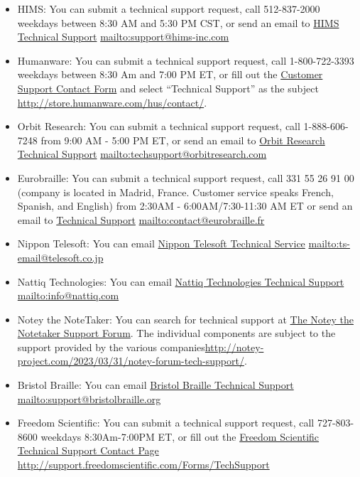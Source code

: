 \begin{itemize}[leftmargin=*]
\item HIMS: You can submit a technical support request, call 512-837-2000 weekdays between 8:30 AM and 5:30 PM CST, or send an email to \href{mailto:support@hims-inc.com}{HIMS Technical Support}  \break\url{mailto:support@hims-inc.com}
\item Humanware: You can submit a technical support request, call 1-800-722-3393 weekdays between 8:30 Am and 7:00 PM ET, or fill out the \href{http://store.humanware.com/hus/contact/}{Customer Support Contact Form} and select ``Technical Support'' as the subject \break\url{http://store.humanware.com/hus/contact/}. 
\item Orbit Research: You can submit a technical support request, call 1-888-606-7248 from 9:00 AM - 5:00 PM ET, or send an email to \href{mailto:techsupport@orbitresearch.com}{Orbit Research Technical Support}  \break\url{mailto:techsupport@orbitresearch.com}
\item Eurobraille: You can submit a technical support request, call 331 55 26 91 00 (company is located in Madrid, France. Customer service speaks French, Spanish, and English) from 2:30AM - 6:00AM/7:30-11:30 AM ET or send an email to \href{mailto:econtact@eurobraille.fr}{Technical Support}  \break\url{mailto:contact@eurobraille.fr}
\item Nippon Telesoft: You can email \href{mailto:ts-email@telesoft.co.jp}{Nippon Telesoft Technical Service}  \break\url{mailto:ts-email@telesoft.co.jp}
\item Nattiq Technologies: You can email \href{mailto:info@nattiq.com}{Nattiq Technologies Technical Support}  \break\url{mailto:info@nattiq.com}
\item Notey the NoteTaker: You can search for technical support at \href{http://notey-project.com/2023/03/31/notey-forum-tech-support/}{The Notey the Notetaker Support Forum}. The individual components are subject to the support provided by the various companies\break\url{http://notey-project.com/2023/03/31/notey-forum-tech-support/}. 
\item Bristol Braille: You can email \href{mailto:support@bristolbraille.org}{Bristol Braille Technical Support}  \break\url{mailto:support@bristolbraille.org}
\item Freedom Scientific: You can submit a technical support request, call 727-803-8600 weekdays 8:30Am-7:00PM ET, or fill out the \href{http://support.freedomscientific.com/Forms/TechSupport}{Freedom Scientific Technical Support Contact Page}  \break\url{http://support.freedomscientific.com/Forms/TechSupport}

\end{itemize}

